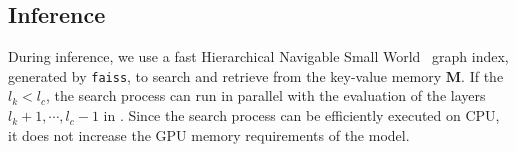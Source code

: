 \subsection{Inference} \label{sec:inference}

During inference, we use a fast Hierarchical Navigable Small World~\citep[HNSW,][]{DBLP:journals/pami/MalkovY20} graph index, generated by \texttt{faiss}, to search and retrieve from the key-value memory $\mathbf{M}$.
If the $l_k < l_c$, the search process can run in parallel with the evaluation of the layers $l_k + 1, \cdots, l_c - 1$ in \ModelName.
Since the search process can be efficiently executed on CPU, it does not increase the GPU memory requirements of the model.


